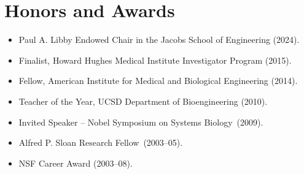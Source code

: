 \documentclass[11pt,a4paper,sans]{moderncv}        %
\begin{document}
\section{Honors and Awards}
\begin{itemize}

\item Paul A. Libby Endowed Chair in the Jacobs School of Engineering (2024). 

\item Finalist, Howard Hughes Medical Institute Investigator Program (2015). 

\item Fellow, American Institute for Medical and Biological Engineering (2014). 

\item Teacher of the Year, UCSD Department of Bioengineering (2010).

\item Invited Speaker -- Nobel Symposium on Systems Biology~(2009).

\item Alfred P. Sloan Research Fellow~(2003--05).

\item NSF Career Award (2003--08).

\end{itemize}


%
\end{document}
